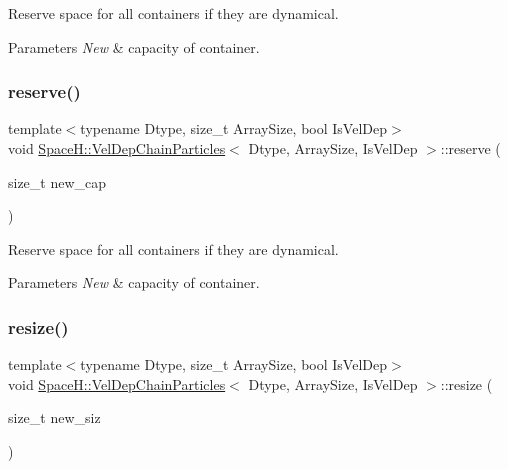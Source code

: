 Reserve space for all containers if they are dynamical. 


\begin{DoxyParams}{Parameters}
{\em New} & capacity of container. \\
\hline
\end{DoxyParams}
\mbox{\label{class_space_h_1_1_vel_dep_chain_particles_a0257a89d0e3058624cc076c2956b94ea}} 
\subsubsection{\texorpdfstring{reserve()}{reserve()}\hspace{0.1cm}{\footnotesize\ttfamily [2/2]}}
{\footnotesize\ttfamily template$<$typename Dtype, size\+\_\+t Array\+Size, bool Is\+Vel\+Dep$>$ \\
void \mbox{\hyperlink{class_space_h_1_1_vel_dep_chain_particles}{Space\+H\+::\+Vel\+Dep\+Chain\+Particles}}$<$ Dtype, Array\+Size, Is\+Vel\+Dep $>$\+::reserve (\begin{DoxyParamCaption}\item[{size\+\_\+t}]{new\+\_\+cap }\end{DoxyParamCaption})\hspace{0.3cm}{\ttfamily [inline]}}



Reserve space for all containers if they are dynamical. 


\begin{DoxyParams}{Parameters}
{\em New} & capacity of container. \\
\hline
\end{DoxyParams}
\mbox{\label{class_space_h_1_1_vel_dep_chain_particles_a8cc7751b890724be0bf72471cb65d761}} 
\subsubsection{\texorpdfstring{resize()}{resize()}\hspace{0.1cm}{\footnotesize\ttfamily [1/2]}}
{\footnotesize\ttfamily template$<$typename Dtype, size\+\_\+t Array\+Size, bool Is\+Vel\+Dep$>$ \\
void \mbox{\hyperlink{class_space_h_1_1_vel_dep_chain_particles}{Space\+H\+::\+Vel\+Dep\+Chain\+Particles}}$<$ Dtype, Array\+Size, Is\+Vel\+Dep $>$\+::resize (\begin{DoxyParamCaption}\item[{size\+\_\+t}]{new\+\_\+siz }\end{DoxyParamCaption})\hspace{0.3cm}{\ttfamily [inline]}}



